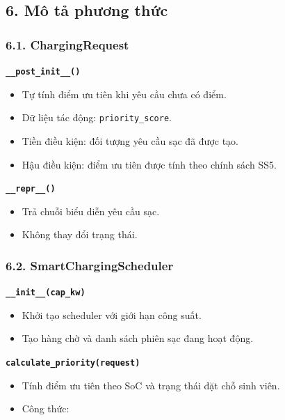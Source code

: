 \documentclass[11pt,a4paper]{article}
\providecommand{\tightlist}{%
  \setlength{\itemsep}{0pt}\setlength{\parskip}{0pt}}
\begin{document}
\hypertarget{muxf4-tux1ea3-phux1b0ux1a1ng-thux1ee9c}{%
\subsection{6. Mô tả phương
thức}\label{muxf4-tux1ea3-phux1b0ux1a1ng-thux1ee9c}}

\hypertarget{chargingrequest-1}{%
\subsubsection{6.1. ChargingRequest}\label{chargingrequest-1}}

\textbf{\texttt{\_\_post\_init\_\_()}}

\begin{itemize}
\tightlist
\item
  Tự tính điểm ưu tiên khi yêu cầu chưa có điểm.
\item
  Dữ liệu tác động: \texttt{priority\_score}.
\item
  Tiền điều kiện: đối tượng yêu cầu sạc đã được tạo.
\item
  Hậu điều kiện: điểm ưu tiên được tính theo chính sách SS5.
\end{itemize}

\textbf{\texttt{\_\_repr\_\_()}}

\begin{itemize}
\tightlist
\item
  Trả chuỗi biểu diễn yêu cầu sạc.
\item
  Không thay đổi trạng thái.
\end{itemize}

\hypertarget{smartchargingscheduler-1}{%
\subsubsection{6.2.
SmartChargingScheduler}\label{smartchargingscheduler-1}}

\textbf{\texttt{\_\_init\_\_(cap\_kw)}}

\begin{itemize}
\tightlist
\item
  Khởi tạo scheduler với giới hạn công suất.
\item
  Tạo hàng chờ và danh sách phiên sạc đang hoạt động.
\end{itemize}

\textbf{\texttt{calculate\_priority(request)}}

\begin{itemize}
\tightlist
\item
  Tính điểm ưu tiên theo SoC và trạng thái đặt chỗ sinh viên.
\item
  Công thức:
\end{itemize}
\end{document}
